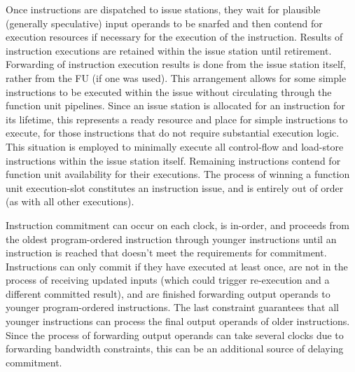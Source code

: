 \documentclass[10pt,twocolumn,dvips]{article}
\begin{document}
Once instructions are dispatched to issue stations,
they wait for plausible (generally speculative) input operands
to be snarfed and then
contend for execution resources if necessary for the execution
of the instruction.
Results of instruction executions are retained within
the issue station until retirement.  
Forwarding of instruction execution
results is done from the issue station itself, rather from the
FU (if one was used).
This arrangement allows for some simple instructions to be executed within
the issue without circulating through the function unit
pipelines.  
Since an issue station is allocated for an instruction for
its lifetime, this represents a ready resource and place for simple
instructions to execute, for those instructions that do 
not require substantial execution logic.  
This situation is employed to minimally execute all
control-flow and load-store instructions within the
issue station itself.
Remaining instructions contend for 
function unit availability for their executions.
The process of winning a function unit execution-slot constitutes
an instruction issue, and is entirely out of order (as with
all other executions).

Instruction commitment can occur on each clock, is in-order, and
proceeds from the oldest program-ordered
instruction through younger instructions until an instruction
is reached that doesn't meet the requirements for commitment.
Instructions can only commit if they have executed at least once,
are not in the process of receiving updated inputs (which could
trigger re-execution and a different committed result),
and are finished forwarding output operands 
to younger program-ordered instructions.  
The last constraint guarantees that all younger
instructions can process the final output operands of older
instructions.
Since the process of forwarding output operands can take several
clocks due to forwarding bandwidth constraints, this can be
an additional source of delaying commitment.
\end{document}

